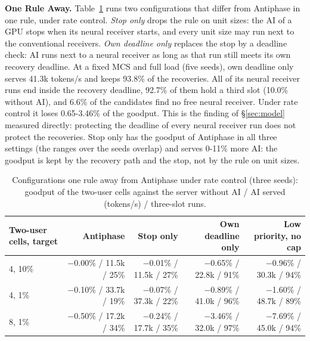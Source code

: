\documentclass[acmsmall,screen,review,anonymous]{acmart}
\newcommand{\sys}{Antiphase\xspace}
\begin{document}
\noindent\textbf{One Rule Away.} Table~\ref{tab:oneaway} runs two configurations that differ from \sys in
one rule, under rate control. \emph{Stop only} drops the rule on unit sizes: the AI of a GPU stops when its
neural receiver starts, and every unit size may run next to the conventional receivers. \emph{Own deadline
only} replaces the stop by a deadline check: AI runs next to a neural receiver as long as that run still
meets its own recovery deadline. At a fixed MCS and full load (five seeds), own deadline only serves 41.3k
tokens/s and keeps 93.8\% of the recoveries. All of its neural receiver runs end inside the recovery
deadline, 92.7\% of them hold a third slot (10.0\% without AI), and 6.6\% of the candidates find no free
neural receiver. Under rate control it loses 0.65-3.46\% of the goodput. This is the finding of
\S\ref{sec:model} measured directly: protecting the deadline of every neural receiver run does not protect
the recoveries. Stop only has the goodput of \sys in all three settings (the ranges over the seeds overlap)
and serves 0-11\% more AI: the goodput is kept by the recovery path and the stop, not by the rule on unit
sizes.

\begin{table}[t]
\caption{Configurations one rule away from \sys under rate control (three seeds): goodput of the two-user
cells against the server without AI / AI served (tokens/s) / three-slot runs.}
\label{tab:oneaway}
\footnotesize
\setlength{\tabcolsep}{3.5pt}
\begin{tabular}{@{}lrrrr@{}}
\toprule
Two-user cells, target & \sys & Stop only & Own deadline only & Low priority, no cap \\
\midrule
4, 10\% & $-$0.00\% / 11.5k / 25\% & $-$0.01\% / 11.5k / 27\% & $-$0.65\% / 22.8k / 91\% & $-$0.96\% / 30.3k / 94\% \\
4, 1\% & $-$0.10\% / 33.7k / 19\% & $-$0.07\% / 37.3k / 22\% & $-$0.89\% / 41.0k / 96\% & $-$1.60\% / 48.7k / 89\% \\
8, 1\% & $-$0.50\% / 17.2k / 34\% & $-$0.24\% / 17.7k / 35\% & $-$3.46\% / 32.0k / 97\% & $-$7.69\% / 45.0k / 94\% \\
\bottomrule
\end{tabular}
\end{table}
\end{document}
